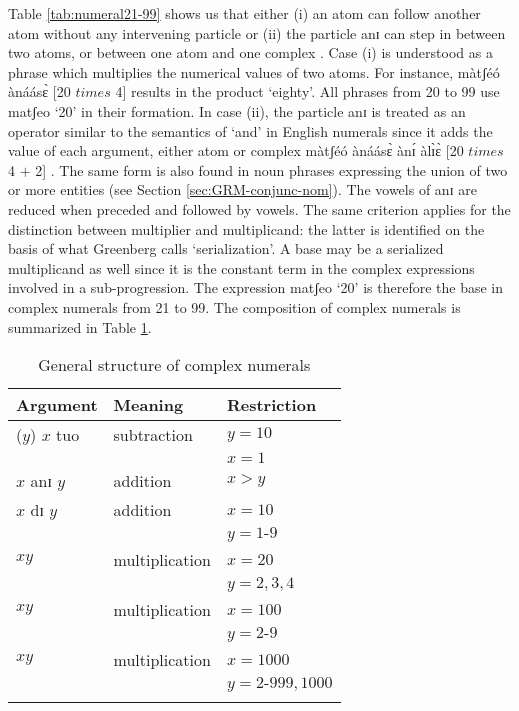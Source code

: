 \begin{exe}
\begin{exe}
\begin{exe}
\begin{exe}
\begin{exe}
\begin{exe}
\begin{exe}
\begin{exe}
\begin{exe}
\begin{exe}
\largerpage
Table \ref{tab:numeral21-99} shows us that either (i) an atom can follow another atom without any intervening particle  or (ii) the particle {\sls anɪ} can step in between two atoms, or between one atom and one complex . Case (i) is understood as a phrase which multiplies the numerical values of  two atoms. For instance, {\sls màtʃéó  ànáásɛ̀} [20 $times$ 4] results in the product `eighty'.  All  phrases from 20 to 99 use {\sls matʃeo} `20'  in their formation. In case (ii),  the particle {\sls anɪ} is treated as an operator similar to the semantics of  `and' in English numerals since it adds the value of each argument, either atom or complex {\sls màtʃéó  ànáásɛ̀ ànɪ́  àlɪ̀ɛ̀} [20 $times$ 4  $+$ 2] .  The same form is also found in noun phrases expressing the union of two or more entities (see Section \ref{sec:GRM-conjunc-nom}). The vowels of {\sls anɪ} are reduced when preceded and followed by vowels. The same criterion applies for the distinction between multiplier and multiplicand: the latter  is identified on the basis of what Greenberg calls `serialization'. A  base may be   a serialized multiplicand as well since it is the constant term in the complex expressions involved in a sub-progression. The expression  {\sls matʃeo} `20' is therefore the base in complex numerals  from 21 to 99. The composition of complex numerals is summarized in Table \ref{tab:threecompo}.



\begin{table}
\caption{General structure of complex numerals  \label{tab:threecompo}}
  \centering

\begin{tabular}{lll}
\lsptoprule
  Argument & Meaning & Restriction\\
\midrule
 ($y$)   $x$   tuo  & subtraction  &$y={10}$\\
&& $x={1}$\\
   $x$ anɪ $y$ & addition  &$x>y$\\
$x$ dɪ $y$  & addition &$x={10}$\\
&& $y={1 \textrm{-}9}$\\%

$x y$ & multiplication &$x=20$\\
&& $y={2,3,4}$\\%
$x y$  & multiplication  &$x={100}$\\
&& $y={2 \textrm{-}9}$\\%
$x y$  & multiplication  &$x={1000}$\\
&& $y={2 \textrm{-}999, 1000}$\\%
\lspbottomrule
\end{tabular}
\end{table}



\end{exe}
\end{exe}
\end{exe}
\end{exe}
\end{exe}
\end{exe}
\end{exe}
\end{exe}
\end{exe}
\end{exe}
